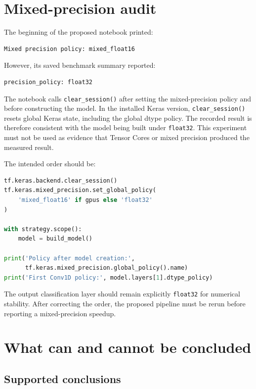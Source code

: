 \documentclass[11pt,a4paper]{article}
\begin{document}
\section{Mixed-precision audit}

The beginning of the proposed notebook printed:

\begin{lstlisting}
Mixed precision policy: mixed_float16
\end{lstlisting}

However, its saved benchmark summary reported:

\begin{lstlisting}
precision_policy: float32
\end{lstlisting}

The notebook calls \texttt{clear\_session()} after setting the mixed-precision
policy and before constructing the model. In the installed Keras version,
\texttt{clear\_session()} resets global Keras state, including the global dtype
policy. The recorded result is therefore consistent with the model being built
under \texttt{float32}. This experiment must not be used as evidence that Tensor
Cores or mixed precision produced the measured result.

The intended order should be:

\begin{lstlisting}[language=Python]
tf.keras.backend.clear_session()
tf.keras.mixed_precision.set_global_policy(
    'mixed_float16' if gpus else 'float32'
)

with strategy.scope():
    model = build_model()

print('Policy after model creation:',
      tf.keras.mixed_precision.global_policy().name)
print('First Conv1D policy:', model.layers[1].dtype_policy)
\end{lstlisting}

The output classification layer should remain explicitly \texttt{float32} for
numerical stability. After correcting the order, the proposed pipeline must be
rerun before reporting a mixed-precision speedup.

\section{What can and cannot be concluded}

\subsection{Supported conclusions}
\end{document}
